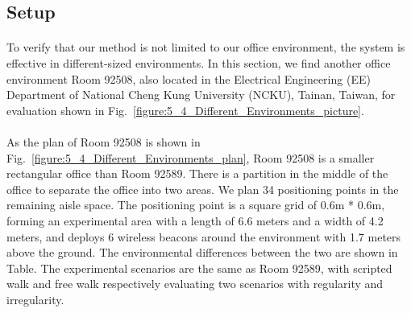 \documentclass[a4paper,12pt]{report}
\begin{document}
\subsection{Setup}
\paragraph{}
To verify that our method is not limited to our office environment, the system is effective in different-sized environments. In this section, we find another office environment Room 92508, also located in the Electrical Engineering (EE) Department of National Cheng Kung University (NCKU), Tainan, Taiwan, for evaluation shown in Fig.~\ref{figure:5_4_Different_Environments_picture}.
%

\paragraph{}
As the plan of Room 92508 is shown in Fig.~\ref{figure:5_4_Different_Environments_plan}, Room 92508 is a smaller rectangular office than Room 92589. There is a partition in the middle of the office to separate the office into two areas. We plan 34 positioning points in the remaining aisle space. The positioning point is a square grid of 0.6m * 0.6m, forming an experimental area with a length of 6.6 meters and a width of 4.2 meters, and deploys 6 wireless beacons around the environment with 1.7 meters above the ground. The environmental differences between the two are shown in Table. The experimental scenarios are the same as Room 92589, with scripted walk and free walk respectively evaluating two scenarios with regularity and irregularity.
%
\end{document}
